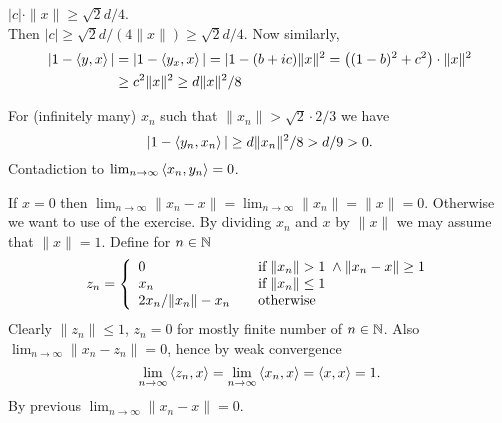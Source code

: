 \begin{enumerate}
\begin{itemize}
\begin{enumerate}
\begin{itemize}
   \(|c|\cdot\|x\| \geq \sqrt{2}d/4\).\\
    Then \(|c| \geq \sqrt{2}d/\left(4\|x\|\right) \geq \sqrt{2}d/4\).
    Now similarly,
    \begin{align*}
    |1 - \left\langle y,x \right\rangle|
    &= |1 - \left\langle y_x,x \right\rangle|
    = |1 - (b + ic)\|x\|^2
    = \left((1 - b)^2 + c^2\right)\cdot\|x\|^2 \\
    &\geq c^2\|x\|^2
    \geq d\|x\|^2/8
    \end{align*}
  \end{itemize}
    For (infinitely many) \(x_n\) such that
    \(\|x_n\| > \sqrt{2}\cdot2/3\)  %
    we have
    \begin{equation*}
    |1 - \left\langle y_n,x_n \right\rangle| \geq d \|x_n\|^2/8 > d/9 > 0.
    \end{equation*}
    Contadiction to \(\lim_{n\to\infty} \left\langle x_n,y_n \right\rangle = 0\).
\end{enumerate}
If \(x=0\) then \(\lim_{n\to\infty}\|x_n - x\| = \lim_{n\to\infty}\|x_n\| = \|x\|=0\).
Otherwise we want to use  of the exercise.
By dividing \(x_n\) and $x$ by \(\|x\|\) we may assume
that \(\|x\|=1\).
Define for \(n\in\mathbb{N}\)
\begin{equation*}
 z_n =
 \left\{\begin{array}{ll}
 0 \quad & \textnormal{if}\;\|x_n\| > 1 \;\wedge \|x_n - x\| \geq 1 \\ 
 x_n \quad & \textnormal{if}\;\|x_n\|\leq 1 \\
 2x_n/\|x_n\|-x_n   \quad & \textnormal{otherwise}
 \end{array}
 \right.
\end{equation*}
Clearly \(\|z_n\|\leq 1\), \(z_n=0\) for mostly finite number of \(n\in \mathbb{N}\).
Also \hbox{\(\lim_{n\to\infty}\|x_n-z_n\| = 0\)}, hence by weak convergence
\begin{equation*}
\lim_{n\to\infty}\left\langle z_n,x \right\rangle = \lim_{n\to\infty}\left\langle x_n,x \right\rangle
 = \left\langle x,x \right\rangle = 1.
\end{equation*}
By previous  \(\lim_{n\to\infty} \|x_n - x\| = 0\).
\end{itemize}


\end{enumerate}
